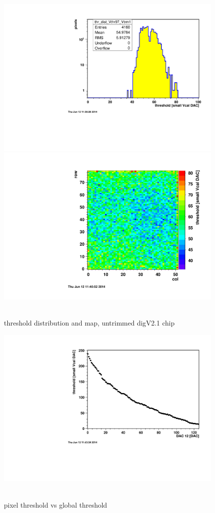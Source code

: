 \documentclass[english]{article}
\begin{document}
%
\begin{figure}
\hfill{}\includegraphics[scale=0.4]{c405-thrdist-untrimmed}\hfill{}\includegraphics[scale=0.4]{c405-thrmap-untrimmed}\hfill{}~\protect\caption{threshold distribution and map, untrimmed digV2.1 chip}
%
\end{figure}


%
\begin{figure}
\hfill{}\includegraphics[scale=0.5]{c405-thr-vs-vthrcomp}\hfill{}~\protect\caption{pixel threshold vs global threshold}
%
\end{figure}
\end{document}
